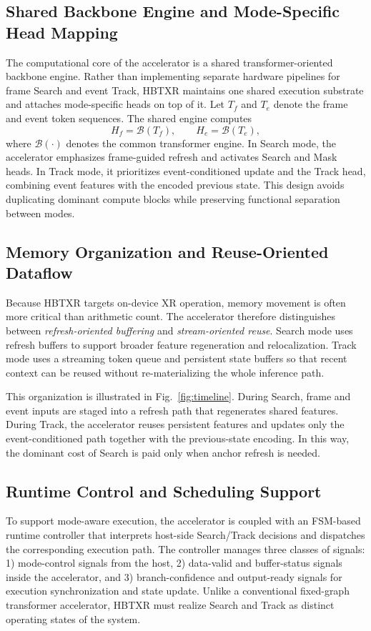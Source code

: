 \documentclass[journal]{IEEEtran}
\begin{document}
\subsection{Shared Backbone Engine and Mode-Specific Head Mapping}
The computational core of the accelerator is a shared transformer-oriented backbone engine. Rather than implementing separate hardware pipelines for frame Search and event Track, HBTXR maintains one shared execution substrate and attaches mode-specific heads on top of it. Let $T_f$ and $T_e$ denote the frame and event token sequences. The shared engine computes
\begin{equation}
H_f=\mathcal{B}(T_f), \qquad H_e=\mathcal{B}(T_e),
\end{equation}
where $\mathcal{B}(\cdot)$ denotes the common transformer engine. In Search mode, the accelerator emphasizes frame-guided refresh and activates Search and Mask heads. In Track mode, it prioritizes event-conditioned update and the Track head, combining event features with the encoded previous state. This design avoids duplicating dominant compute blocks while preserving functional separation between modes.

\subsection{Memory Organization and Reuse-Oriented Dataflow}
Because HBTXR targets on-device XR operation, memory movement is often more critical than arithmetic count. The accelerator therefore distinguishes between \emph{refresh-oriented buffering} and \emph{stream-oriented reuse}. Search mode uses refresh buffers to support broader feature regeneration and relocalization. Track mode uses a streaming token queue and persistent state buffers so that recent context can be reused without re-materializing the whole inference path.

This organization is illustrated in Fig.~\ref{fig:timeline}. During Search, frame and event inputs are staged into a refresh path that regenerates shared features. During Track, the accelerator reuses persistent features and updates only the event-conditioned path together with the previous-state encoding. In this way, the dominant cost of Search is paid only when anchor refresh is needed.

\subsection{Runtime Control and Scheduling Support}
To support mode-aware execution, the accelerator is coupled with an FSM-based runtime controller that interprets host-side Search/Track decisions and dispatches the corresponding execution path. The controller manages three classes of signals: 1) mode-control signals from the host, 2) data-valid and buffer-status signals inside the accelerator, and 3) branch-confidence and output-ready signals for execution synchronization and state update. Unlike a conventional fixed-graph transformer accelerator, HBTXR must realize Search and Track as distinct operating states of the system.
\end{document}
